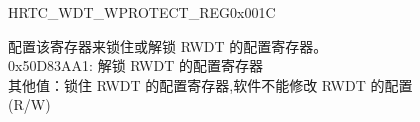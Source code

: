 \begin{register}{H}{RTC\_WDT\_WPROTECT\_REG}{0x001C}\label{regdesc:RTCWDTWPROTECTREG}
%
\regnewline%
\begin{regdesc}\begin{reglist}
\label{fielddesc:RTCWDTWKEY}\item [RTC\_WDT\_WKEY] 配置该寄存器来锁住或解锁 RWDT 的配置寄存器。\\
0x50D83AA1: 解锁 RWDT 的配置寄存器 \\
其他值：锁住 RWDT 的配置寄存器,软件不能修改 RWDT 的配置 \\
 (R/W)
\end{reglist}\end{regdesc}
\end{register}


